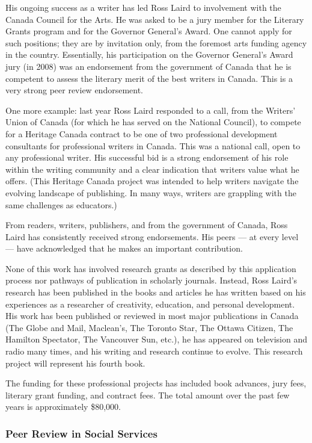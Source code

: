 \documentclass[letterpaper,10pt,headsepline]{scrreprt}
\begin{document}
His ongoing success as a writer has led Ross Laird to involvement with the
Canada Council for the Arts. He was asked to be a jury member for the Literary
Grants program and for the Governor General's Award. One cannot apply for such
positions; they are by invitation only, from the foremost arts funding agency
in the country. Essentially, his participation on the Governor General's Award
jury (in 2008) was an endorsement from the government of Canada that he is
competent to assess the literary merit of the best writers in Canada. This is
a very strong peer review endorsement.

One more example: last year Ross Laird responded to a call, from the Writers'
Union of Canada (for which he has served on the National Council), to compete
for a Heritage Canada contract to be one of two professional development
consultants for professional writers in Canada. This was a national call, open
to any professional writer. His successful bid is a strong endorsement of his
role within the writing community and a clear indication that writers value
what he offers. (This Heritage Canada project was intended to help writers
navigate the evolving landscape of publishing. In many ways, writers are
grappling with the same challenges as educators.)

From readers, writers, publishers, and from the government of Canada, Ross
Laird has consistently received strong endorsements. His peers --- at every
level --- have acknowledged that he makes an important contribution.

None of this work has involved research grants as described by this
application process nor pathways of publication in scholarly journals.
Instead, Ross Laird's research has been published in the books and articles he
has written based on his experiences as a researcher of creativity, education,
and personal development. His work has been published or reviewed in most
major publications in Canada (The Globe and Mail, Maclean's, The Toronto Star,
The Ottawa Citizen, The Hamilton Spectator, The Vancouver Sun, etc.), he has
appeared on television and radio many times, and his writing and research
continue to evolve. This research project will represent his fourth book.

The funding for these professional projects has included book advances, jury
fees, literary grant funding, and contract fees. The total amount over the
past few years is approximately \$80,000.

\subsubsection{Peer Review in Social Services}
\end{document}
